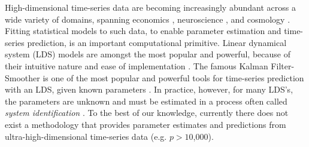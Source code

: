 \documentclass[fleqn,12pt]{article}
\newcommand{\mrsid}{{\sc \texttt{Mr}.~\texttt{Sid}}}
\begin{document}
High-dimensional  time-series data are becoming increasingly  abundant across a wide variety of domains, spanning economics \citep{Johansen1988}, neuroscience \citep{Friston2003a},   and cosmology \citep{Xie2013a}. Fitting statistical models to such data, to enable parameter estimation and time-series prediction, is an important computational primitive.
Linear dynamical system (LDS) models are amongst the most popular and powerful, because of their intuitive nature and ease of implementation \citep{Kalman1963}.   The famous Kalman Filter-Smoother is one of the most popular and powerful tools for time-series prediction with an LDS, given known parameters \citep{Kalman1960a}.
%
%
%
In practice, however, for many LDS's, the parameters are unknown and must be estimated in a process often called \emph{system identification} \citep{Ljung1998}.  To the best of our knowledge, currently there does not exist a methodology that provides parameter estimates and predictions from ultra-high-dimensional time-series data (e.g. $p > 10$,$000$).
%
%
%
\end{document}
